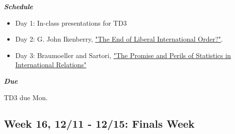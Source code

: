 \documentclass[11pt,]{article}
\begin{document}
\begin{multicols}{2}

\textbf{\textit{Schedule}}

\begin{itemize}

\item Day 1: In-class presentations for TD3

\item Day 2: G. John Ikenberry, \href{https://watermark.silverchair.com/iix241.pdf?token=AQECAHi208BE49Ooan9kkhW_Ercy7Dm3ZL_9Cf3qfKAc485ysgAAArgwggK0BgkqhkiG9w0BBwagggKlMIICoQIBADCCApoGCSqGSIb3DQEHATAeBglghkgBZQMEAS4wEQQMmvNmPUQrjGzOH1cEAgEQgIICa46bVbYQMMIAnXOVSxX24aIcW7dPVAXpm5-3dJ7prKdvtqKeJMhggBTfwFrwPeSm112dIEScmPTZfjNsRJcEHxs5ZzYXZvENhxBP1ezkdCLPxujOG9w5I6T5GZzXgHo5k-xwMJRZF6o1dSIYCnvs18ytxHCNes2CFy0Lw0frPeGOSlT5JfJ8u1sUOKtfjT8v00Ji1PdY05DWUlWxmt56AChy3aM8ZiEFX0oNpiydbzYpIF-GFMi1CG3kbhEUO4OzB-jz-TaSKnEJyHjHx3u_GxZCSaywU4msPU-KGeNC7J0DIZW3OIvay9qM9e4pkOs4d5uQd7D06aFNga1l25Qk6K3cDUJgLwCUBpRrC1ErqU0lCNTTwkdycbtXPphZ_yiQnYhdD9haZKq9fOJhF8L6ykKfH2kJqLtFpgb940RTM1iJYF0uYd9fudlIRazxMFBbDOg1Dxlgy3_pNVPHecI7KbUYY3AeZxEKSsuKJjQsf77B_esZ30b-_uF4aIC9sSLEuQ8mPCnVK5Cr9uBXsJP6dsd3_80LRKKubF58EnEE6iwCHZwlGxFggiDCmjx0yTkzz7Br-lJ1l1c-LtFauHEYeIYdBfEGoWAvXt4nzBgA8ZUzy8XNloYvRPdlHh07pf7gO1azWqrD4H_QHlWY1VLIok5Xu4cw1u2l4eAGdHcoGquTqseeYMXfxy2pt3ZCAHVCTww8S4kQZTsCNk4LerHyVG5cczh7bcP46PPa-Gt7r0cjZVBItY0oVv5y0aP4-EtbslKFztVrhVfCof0XNoF6Y-1cjsqjA6ilZX26Vq0C4TML_Eygay-07Cj10tQ}{"The End of Liberal International Order?"}.

\item Day 3: Braumoeller and Sartori, \href{https://drive.google.com/file/d/1-QQRAw_6j2YBWQ2_RgWz6IRp-GA7hbyf/view?usp=sharing}{"The Promise and Perils of Statistics in International Relations"}

\end{itemize}

\columnbreak

\begin{flushright}

\textbf{\textit{Due}}

TD3 due Mon.

\end{flushright}

\end{multicols}

\hypertarget{week-16-1211---1215-finals-week}{%
\subsection{Week 16, 12/11 - 12/15: Finals
Week}\label{week-16-1211---1215-finals-week}}
\end{document}
